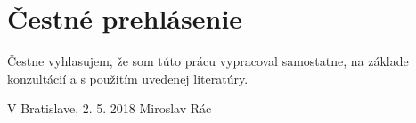 \thispagestyle{empty}
\vspace*{\fill}
\section*{Čestné prehlásenie}

Čestne vyhlasujem, že som túto prácu vypracoval samostatne, na základe konzultácií
a s použitím uvedenej literatúry.

\vspace{2cm}
V Bratislave, 2. 5. 2018 \hfill Miroslav Rác

\newpage
\thispagestyle{empty}
\mbox{}
\newpage